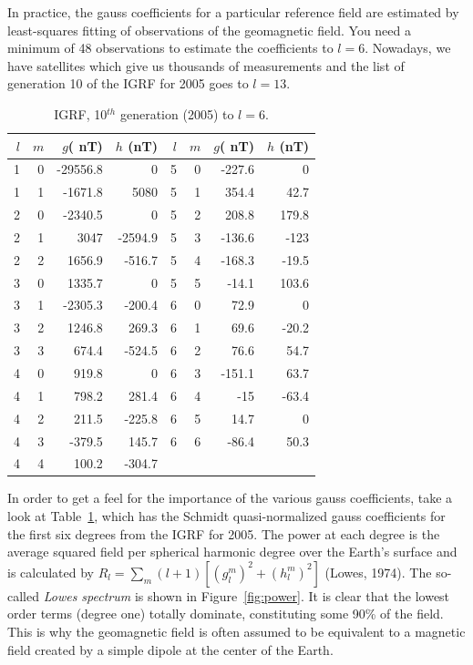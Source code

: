 In practice, the   gauss
coefficients for a particular reference field are estimated by least-squares fitting of  observations of the geomagnetic field.  You need a minimum of  48
observations to estimate the coefficients to $l=6$.  Nowadays, we have satellites which give us  thousands of measurements and the list of generation 10 of the IGRF for 2005 goes to $l=13$.  


\begin{table}[h!tb]
\begin{center}
\caption {IGRF,  10$^{th}$ generation (2005) to $l=6$.}
\label{tab:igrf05}
\begin{tabular}{r r r r|rrrr}
\hline
$l$&$m$&$g $( nT) &$h$ (nT) & $l$&$m$&$g $( nT) &$h$ (nT) \\
\hline
1 & 0 & -29556.8 & 0 & 5 & 0 & -227.6 & 0\\
1 & 1 & -1671.8 & 5080 & 5 & 1 & 354.4 & 42.7\\
2 & 0 & -2340.5 & 0 & 5 & 2 & 208.8 & 179.8\\
2 & 1 & 3047 & -2594.9 & 5 & 3 & -136.6 & -123\\
2 & 2 & 1656.9 & -516.7 & 5 & 4 & -168.3 & -19.5\\
3 & 0 & 1335.7 & 0 & 5 & 5 & -14.1 & 103.6\\
3 & 1 & -2305.3 & -200.4 & 6 & 0 & 72.9 & 0\\
3 & 2 & 1246.8 & 269.3 & 6 & 1 & 69.6 & -20.2\\
3 & 3 & 674.4 & -524.5 & 6 & 2 & 76.6 & 54.7\\
4 & 0 & 919.8 & 0 & 6 & 3 & -151.1 & 63.7\\
4 & 1 & 798.2 & 281.4 & 6 & 4 & -15 & -63.4\\
4 & 2 & 211.5 & -225.8 & 6 & 5 & 14.7 & 0\\
4 & 3 & -379.5 & 145.7 & 6 & 6 & -86.4 & 50.3\\
4 & 4 & 100.2 & -304.7 &  &  &  & \\
 \hline
\end{tabular}
\end{center}
\end{table}
  


In order to get a feel for the importance of the various gauss coefficients, take a look at Table~\ref{tab:igrf05}, which has the Schmidt quasi-normalized gauss coefficients for the first six degrees from the IGRF for 2005.   
The power at each degree is the average squared field per spherical harmonic degree over the Earth's surface and is calculated by  $R_l=\sum_m (l+1)[(g_l^m)^2 + (h_l^m)^2]$
 \nocite{lowes74} 
(Lowes, 1974). 
The  so-called 
{\it Lowes spectrum} is shown in 
Figure~\ref{fig:power}.  It is clear that the lowest order terms (degree one) totally
dominate,   constituting some 90\% of the field.    This is why the geomagnetic field is often assumed to be equivalent to a magnetic field created by a simple dipole at the center of the Earth.   



